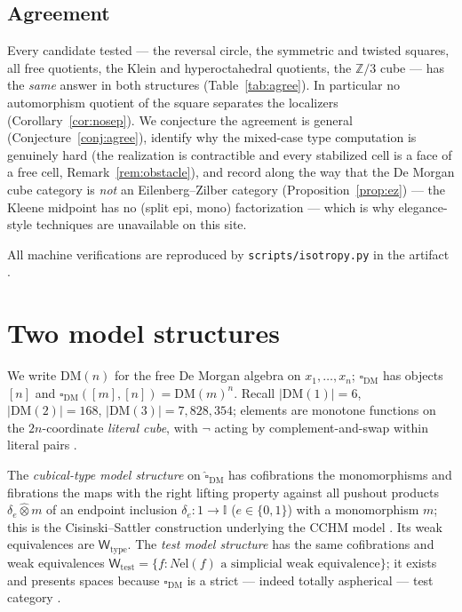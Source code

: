 \documentclass[11pt]{amsart}
\theoremstyle{definition}
\newcommand{\I}{\mathbb{I}}
\newcommand{\cube}{\square_{\mathrm{DM}}}
\newcommand{\el}{\mathrm{el}}
\newcommand{\DM}{\mathrm{DM}}
\newcommand{\Wtest}{\mathsf{W}_{\mathrm{test}}}
\newcommand{\Wtype}{\mathsf{W}_{\mathrm{type}}}
\begin{document}
\subsection*{Agreement}
Every candidate tested --- the reversal circle, the symmetric and
twisted squares, all free quotients, the Klein and hyperoctahedral
quotients, the $\mathbb{Z}/3$ cube --- has the \emph{same} answer
in both structures (Table~\ref{tab:agree}).  In particular no
automorphism quotient of the square separates the localizers
(Corollary~\ref{cor:nosep}).  We conjecture the agreement is
general (Conjecture~\ref{conj:agree}), identify why the mixed-case
type computation is genuinely hard (the realization is
contractible and every stabilized cell is a face of a free cell,
Remark~\ref{rem:obstacle}), and record along the way that the De
Morgan cube category is \emph{not} an Eilenberg--Zilber category
(Proposition~\ref{prop:ez}) --- the Kleene midpoint has no
(split epi, mono) factorization --- which is why elegance-style
techniques are unavailable on this site.

All machine verifications are reproduced by
\texttt{scripts/isotropy.py} in the artifact \cite{Artifact}.

\section{Two model structures}
\label{sec:prelim}

We write $\DM(n)$ for the free De Morgan algebra on $x_1, \dots,
x_n$; $\cube$ has objects $[n]$ and $\cube([m],[n]) =
\DM(m)^n$.  Recall $|\DM(1)| = 6$, $|\DM(2)| = 168$,
$|\DM(3)| = 7{,}828{,}354$; elements are monotone functions on the
$2n$-coordinate \emph{literal cube}, with $\neg$ acting by
complement-and-swap within literal pairs \cite{PaperG}.

The \emph{cubical-type model structure} on $\widehat\cube$ has
cofibrations the monomorphisms and fibrations the maps with the
right lifting property against all pushout products
$\delta_e \mathbin{\hat\otimes} m$ of an endpoint inclusion
$\delta_e : 1 \to \I$ ($e \in \{0,1\}$) with a monomorphism $m$;
this is the Cisinski--Sattler construction underlying the CCHM
model \cite{CCHM, Sattler}.  Its weak equivalences are $\Wtype$.
The \emph{test model structure} has the same cofibrations and weak
equivalences $\Wtest = \{f : N\el(f) \text{ a simplicial weak
  equivalence}\}$; it exists and presents spaces because $\cube$
is a strict --- indeed totally aspherical --- test category
\cite{Cisinski, Maltsiniotis, BuchholtzMorehouse}.
\end{document}
